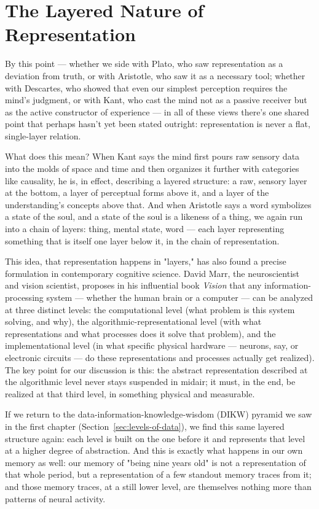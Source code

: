 \newpage
\section{The Layered Nature of Representation}
\label{sec:layered-representation}

By this point --- whether we side with Plato, who saw representation as a deviation from truth, or with Aristotle, who saw it as a necessary tool; whether with Descartes, who showed that even our simplest perception requires the mind's judgment, or with Kant, who cast the mind not as a passive receiver but as the active constructor of experience --- in all of these views there's one shared point that perhaps hasn't yet been stated outright: representation is never a flat, single-layer relation.

What does this mean? When Kant says the mind first pours raw sensory data into the molds of space and time and then organizes it further with categories like causality, he is, in effect, describing a layered structure: a raw, sensory layer at the bottom, a layer of perceptual forms above it, and a layer of the understanding's concepts above that. And when Aristotle says a word symbolizes a state of the soul, and a state of the soul is a likeness of a thing, we again run into a chain of layers: thing, mental state, word --- each layer representing something that is itself one layer below it, in the chain of representation.

This idea, that representation happens in "layers," has also found a precise formulation in contemporary cognitive science. David Marr, the neuroscientist and vision scientist, proposes in his influential book \textit{Vision} that any information-processing system --- whether the human brain or a computer --- can be analyzed at three distinct levels: the computational level (what problem is this system solving, and why), the algorithmic-representational level (with what representations and what processes does it solve that problem), and the implementational level (in what specific physical hardware --- neurons, say, or electronic circuits --- do these representations and processes actually get realized)\autocite{marr1982}. The key point for our discussion is this: the abstract representation described at the algorithmic level never stays suspended in midair; it must, in the end, be realized at that third level, in something physical and measurable.

If we return to the data-information-knowledge-wisdom (DIKW) pyramid we saw in the first chapter (Section~\ref{sec:levels-of-data}), we find this same layered structure again: each level is built on the one before it and represents that level at a higher degree of abstraction. And this is exactly what happens in our own memory as well: our memory of "being nine years old" is not a representation of that whole period, but a representation of a few standout memory traces from it; and those memory traces, at a still lower level, are themselves nothing more than patterns of neural activity.

